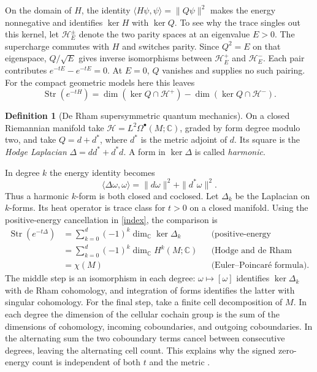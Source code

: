 \documentclass[11pt]{article}
\theoremstyle{definition}
\newtheorem{defn}{Definition}[section]
\newcommand{\Str}{\operatorname{Str}}
\begin{document}
On the domain of \(H\), the identity \(\langle H\psi,\psi\rangle=\|Q\psi\|^2\) makes the energy nonnegative and identifies \(\ker H\) with \(\ker Q\). To see why the trace singles out this kernel, let \(\mathcal H_E^\pm\) denote the two parity spaces at an eigenvalue \(E>0\). The supercharge commutes with \(H\) and switches parity. Since \(Q^2=E\) on that eigenspace, \(Q/\sqrt E\) gives inverse isomorphisms between \(\mathcal H_E^+\) and \(\mathcal H_E^-\). Each pair contributes \(e^{-tE}-e^{-tE}=0\). At \(E=0\), \(Q\) vanishes and supplies no such pairing. For the compact geometric models here this leaves
\begin{equation}\label{index}
\Str(e^{-tH})=\dim(\ker Q\cap\mathcal H^+)-\dim(\ker Q\cap\mathcal H^-).
\end{equation}

\begin{defn}[De Rham supersymmetric quantum mechanics]
On a closed Riemannian manifold take \(\mathcal H=L^2\Omega^\bullet(M;\mathbb C)\), graded by form degree modulo two, and take \(Q=d+d^*\), where \(d^*\) is the metric adjoint of \(d\). Its square is the \emph{Hodge Laplacian} \(\Delta=dd^*+d^*d\). A form in \(\ker\Delta\) is called \emph{harmonic}.
\end{defn}

In degree \(k\) the energy identity becomes
\[
\langle \Delta\omega,\omega\rangle=\|d\omega\|^2+\|d^*\omega\|^2.
\]
Thus a harmonic \(k\)-form is both closed and coclosed. Let \(\Delta_k\) be the Laplacian on \(k\)-forms. Its heat operator is trace class for \(t>0\) on a closed manifold. Using the positive-energy cancellation in \eqref{index}, the comparison is
\[
\begin{aligned}
 \Str(e^{-t\Delta})
 &=\sum_{k=0}^{d}(-1)^k\dim_{\mathbb C}\ker\Delta_k
 &&\text{(positive-energy cancellation)}\\
 &=\sum_{k=0}^{d}(-1)^k\dim_{\mathbb C}H^k(M;\mathbb C)
 &&\text{(Hodge and de Rham theorems)}\\
 &=\chi(M)
 &&\text{(Euler--Poincar\'e formula).}
\end{aligned}
\]
The middle step is an isomorphism in each degree: \(\omega\mapsto[\omega]\) identifies \(\ker\Delta_k\) with de Rham cohomology, and integration of forms identifies the latter with singular cohomology. For the final step, take a finite cell decomposition of \(M\). In each degree the dimension of the cellular cochain group is the sum of the dimensions of cohomology, incoming coboundaries, and outgoing coboundaries. In the alternating sum the two coboundary terms cancel between consecutive degrees, leaving the alternating cell count. This explains why the signed zero-energy count is independent of both \(t\) and the metric \cite[\S\S1--2]{Wm}.
\end{document}
